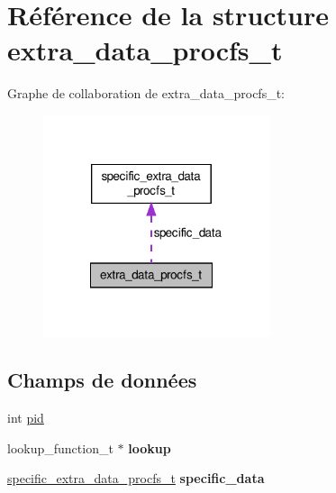 \hypertarget{structextra__data__procfs__t}{\section{Référence de la structure extra\+\_\+data\+\_\+procfs\+\_\+t}
\label{structextra__data__procfs__t}
}


Graphe de collaboration de extra\+\_\+data\+\_\+procfs\+\_\+t\+:\nopagebreak
\begin{figure}[H]
\begin{center}
\leavevmode
\includegraphics[width=189pt]{structextra__data__procfs__t__coll__graph}
\end{center}
\end{figure}
\subsection*{Champs de données}
\begin{DoxyCompactItemize}
\item 
int \hyperlink{structextra__data__procfs__t_ad501deb466cabf589b4617eac9bcce30}{pid}
\item 
\hypertarget{structextra__data__procfs__t_ae8a1311a89d7e8a5ff387e86ee8a3572}{lookup\+\_\+function\+\_\+t $\ast$ {\bfseries lookup}}\label{structextra__data__procfs__t_ae8a1311a89d7e8a5ff387e86ee8a3572}

\item 
\hypertarget{structextra__data__procfs__t_afc77f89e2b31bb14ffa0fb90254df43d}{\hyperlink{unionspecific__extra__data__procfs__t}{specific\+\_\+extra\+\_\+data\+\_\+procfs\+\_\+t} {\bfseries specific\+\_\+data}}\label{structextra__data__procfs__t_afc77f89e2b31bb14ffa0fb90254df43d}

\end{DoxyCompactItemize}


